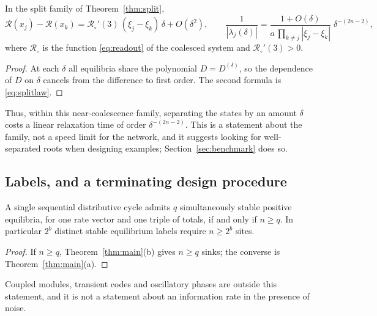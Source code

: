 \begin{corollary}\label{cor:tradeoff}
In the split family of Theorem~\ref{thm:split},
\[
 \mathcal R(x_j)-\mathcal R(x_k)=\mathcal R_\circ'(3)\,(\xi_j-\xi_k)\,\delta+O(\delta^2),\qquad
 \frac{1}{|\lambda_j(\delta)|}=\frac{1+O(\delta)}{a\,\prod_{k\ne j}|\xi_j-\xi_k|}\;\delta^{-(2n-2)},
\]
where \(\mathcal R_\circ\) is the function \eqref{eq:readout} of the coalesced system and
\(\mathcal R_\circ'(3)>0\).
\end{corollary}
\begin{proof}
At each \(\delta\) all equilibria share the polynomial \(D=D^{(\delta)}\), so the dependence of
\(D\) on \(\delta\) cancels from the difference to first order. The second formula is
\eqref{eq:splitlaw}.
\end{proof}

Thus, within this near-coalescence family, separating the states by an amount \(\delta\) costs
a linear relaxation time of order \(\delta^{-(2n-2)}\). This is a statement about the family,
not a speed limit for the network, and it suggests looking for well-separated roots when
designing examples; Section~\ref{sec:benchmark} does so.

\subsection{Labels, and a terminating design procedure}
\begin{corollary}\label{cor:labels}
A single sequential distributive cycle admits \(q\) simultaneously stable positive equilibria,
for one rate vector and one triple of totals, if and only if \(n\ge q\). In particular
\(2^{b}\) distinct stable equilibrium labels require \(n\ge2^{b}\) sites.
\end{corollary}
\begin{proof}
If \(n\ge q\), Theorem~\ref{thm:main}(b) gives \(n\ge q\) sinks; the converse is
Theorem~\ref{thm:main}(a).
\end{proof}

Coupled modules, transient codes and oscillatory phases are outside this statement, and it is
not a statement about an information rate in the presence of noise.

